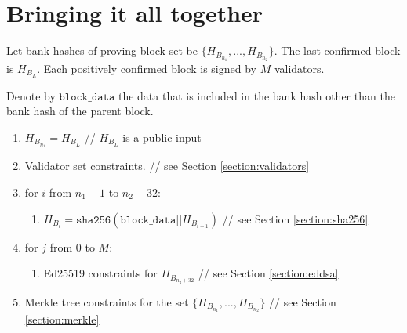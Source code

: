 \section{Bringing it all together}
\label{section:full}

Let bank-hashes of proving block set be $\{H_{B_{n_1}}, ..., H_{B_{n_2}}\}$.
The last confirmed block is $H_{B_{L}}$.
Each positively confirmed block is signed by $M$ validators. 

Denote by $\texttt{block\_data}$ the data that is included in the bank hash other than the bank hash of the parent block.

\begin{enumerate}
	\item $H_{B_{n_1}} = H_{B_{L}}$ // $ H_{B_{L}}$ is a public input
	\item Validator set constraints. // see Section \ref{section:validators}
	\item for $i$ from $n_1 + 1$ to $n_2 + 32$:
	\begin{enumerate}
		\item $H_{B_i} = \texttt{sha256}(\texttt{block\_data} || H_{B_{i - 1}})$ // see Section \ref{section:sha256}
	\end{enumerate}
	\item for $j$ from $0$ to $M$:
	\begin{enumerate}
		\item Ed25519 constraints for $H_{B_{n_2 + 32}}$ // see Section \ref{section:eddsa}
	\end{enumerate}
	\item Merkle tree constraints for the set $\{H_{B_{n_1}}, ..., H_{B_{n_2}}\}$ // see Section \ref{section:merkle}
\end{enumerate}